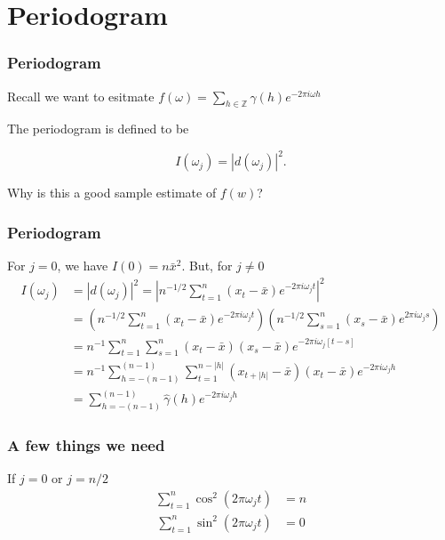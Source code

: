 \documentclass[%
xcolor=pdftex]{beamer}
\begin{document}
\section{Periodogram}
\frame{\tableofcontents[currentsection]}

\begin{frame}
\frametitle{Periodogram}

Recall we want to esitmate $f(\omega) = \sum_{h \in \mathbb{Z}} \gamma(h) e^{-2\pi i \omega h}$
\newline

The periodogram is defined to be

\begin{equation} \label{eq:period}
I(\omega_j) =|d(\omega_j)|^2.
\end{equation}

Why is this a good sample estimate of $f(w)$?

\end{frame}


\begin{frame}
\frametitle{Periodogram}

For $j=0$, we have $I(0) = n \bar{x}^2$. But, for $j \neq 0$
\begin{align*}
I(\omega_j) &=|d(\omega_j)|^2 
= \left| n^{-1/2} \sum_{t=1}^n (x_t - \bar{x}) e^{-2 \pi i \omega_j t} \right|^2 \\
&= \left( n^{-1/2} \sum_{t=1}^n (x_t - \bar{x}) e^{-2 \pi i \omega_j t} \right)\left( n^{-1/2} \sum_{s=1}^n (x_s - \bar{x}) e^{2 \pi i \omega_j s} \right) \\
&=  n^{-1} \sum_{t=1}^n\sum_{s=1}^n  (x_t - \bar{x})(x_s - \bar{x}) e^{-2 \pi i \omega_j [t-s]}  \\
&=  n^{-1} \sum_{h=-(n-1)}^{(n-1)}\sum_{t=1}^{n-|h|}  (x_{t+|h|} - \bar{x})(x_t - \bar{x}) e^{-2 \pi i \omega_j h}  \\
&=  \sum_{h=-(n-1)}^{(n-1)} \hat{\gamma}(h) e^{-2 \pi i \omega_j h}  
\end{align*}


\end{frame}




\begin{frame}
\frametitle{A few things we need}

If $j=0$ or $j=n/2$
\begin{align*}
\sum_{t=1}^n \cos^2(2 \pi \omega_j t)  &= n
\end{align*}
\begin{align*}
\sum_{t=1}^n \sin^2(2 \pi \omega_j t)  &= 0
\end{align*}


\end{frame}
\end{document}
